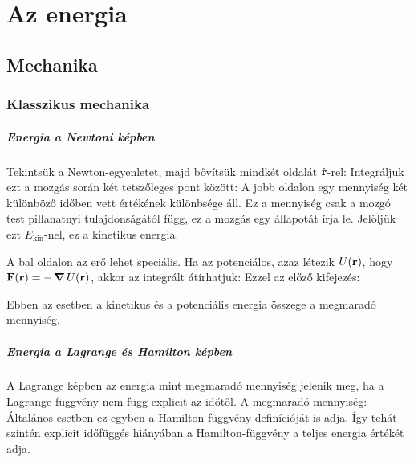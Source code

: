 \chapter{Az energia}

 \section{Mechanika}
  
  \subsection{Klasszikus mechanika}
   
   \paragraph{Energia a Newtoni képben}
    
    Tekintsük a Newton-egyenletet, majd bővítsük mindkét oldalát $\dot{\mathbf{r}}$-rel:
    Integráljuk ezt a mozgás során két tetszőleges pont között:
    A jobb oldalon egy mennyiség két különböző időben vett értékének különbsége áll. Ez a mennyiség csak a mozgó test pillanatnyi tulajdonságától függ, ez a mozgás egy állapotát írja le. Jelöljük ezt $E_\text{kin}$-nel, ez a kinetikus energia. 
    
    A bal oldalon az erő lehet speciális. Ha az potenciálos, azaz létezik $U(\mathbf{r})$, hogy $\mathbf{F}(\mathbf{r})=-\mathop{\boldsymbol{\nabla}}\nolimits{U(\mathbf{r})}$, akkor az integrált átírhatjuk: 
    Ezzel az előző kifejezés:
    
    Ebben az esetben a kinetikus és a potenciális energia összege a megmaradó mennyiség. 
    
   \paragraph{Energia a Lagrange és Hamilton képben}
    
    A Lagrange képben az energia mint megmaradó mennyiség jelenik meg, ha a Lagrange-függvény nem függ explicit az időtől. A megmaradó mennyiség:
    Általános esetben ez egyben a Hamilton-függvény definícióját is adja. Így tehát szintén explicit időfüggés hiányában a Hamilton-függvény a teljes energia értékét adja. 
    
